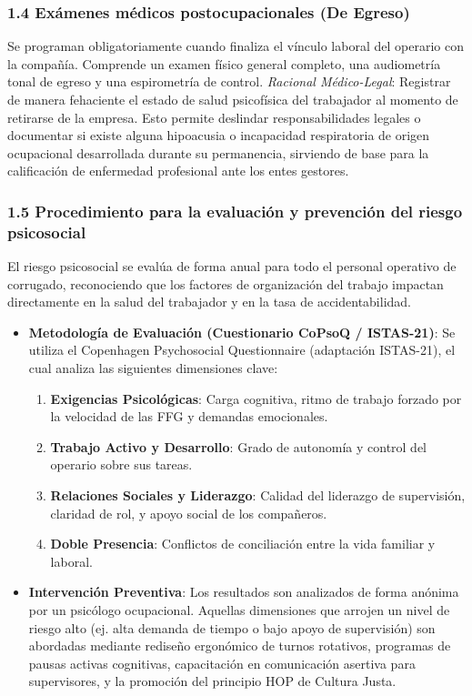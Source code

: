 \documentclass[11pt, letterpaper]{article}
\begin{document}
\subsubsection{1.4 Exámenes médicos postocupacionales (De Egreso)}
Se programan obligatoriamente cuando finaliza el vínculo laboral del operario con la compañía. Comprende un examen físico general completo, una audiometría tonal de egreso y una espirometría de control. \textit{Racional Médico-Legal}: Registrar de manera fehaciente el estado de salud psicofísica del trabajador al momento de retirarse de la empresa. Esto permite deslindar responsabilidades legales o documentar si existe alguna hipoacusia o incapacidad respiratoria de origen ocupacional desarrollada durante su permanencia, sirviendo de base para la calificación de enfermedad profesional ante los entes gestores.

\subsubsection{1.5 Procedimiento para la evaluación y prevención del riesgo psicosocial}
El riesgo psicosocial se evalúa de forma anual para todo el personal operativo de corrugado, reconociendo que los factores de organización del trabajo impactan directamente en la salud del trabajador y en la tasa de accidentabilidad.
\begin{itemize}
    \item \textbf{Metodología de Evaluación (Cuestionario CoPsoQ / ISTAS-21)}: Se utiliza el Copenhagen Psychosocial Questionnaire (adaptación ISTAS-21), el cual analiza las siguientes dimensiones clave:
    \begin{enumerate}
        \item \textbf{Exigencias Psicológicas}: Carga cognitiva, ritmo de trabajo forzado por la velocidad de las FFG y demandas emocionales.
        \item \textbf{Trabajo Activo y Desarrollo}: Grado de autonomía y control del operario sobre sus tareas.
        \item \textbf{Relaciones Sociales y Liderazgo}: Calidad del liderazgo de supervisión, claridad de rol, y apoyo social de los compañeros.
        \item \textbf{Doble Presencia}: Conflictos de conciliación entre la vida familiar y laboral.
    \end{enumerate}
    \item \textbf{Intervención Preventiva}: Los resultados son analizados de forma anónima por un psicólogo ocupacional. Aquellas dimensiones que arrojen un nivel de riesgo alto (ej. alta demanda de tiempo o bajo apoyo de supervisión) son abordadas mediante rediseño ergonómico de turnos rotativos, programas de pausas activas cognitivas, capacitación en comunicación asertiva para supervisores, y la promoción del principio HOP de Cultura Justa.
\end{itemize}
\end{document}
